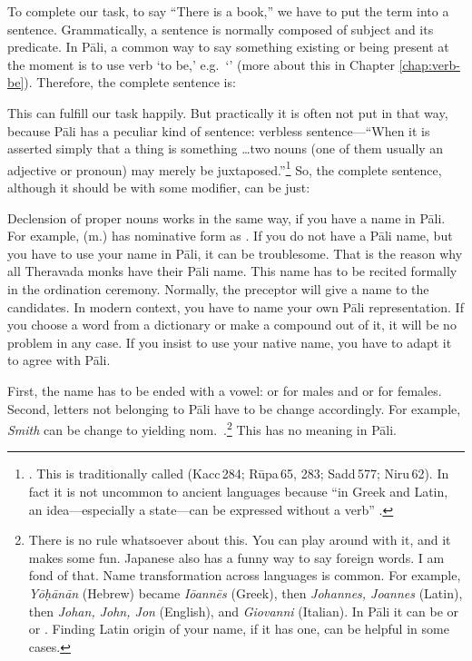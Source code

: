 To complete our task, to say ``There is a book,'' we have to put the term into a sentence. Grammatically, a sentence is normally composed of subject and its predicate. In P\=ali, a common way to say something existing or being present at the moment is to use verb `to be,' e.g.\ `' (more about this in Chapter \ref{chap:verb-be}). Therefore, the complete sentence is:


This can fulfill our task happily. But practically it is often not put in that way, because P\=ali has a peculiar kind of sentence: verbless sentence---``When it is asserted simply that a thing is something \ldots two nouns (one of them usually an adjective or pronoun) may merely be juxtaposed.''\footnote{\citealp[p.~9]{warder:intro}. This is traditionally called  (Kacc\,284; R\=upa\,65, 283; Sadd\,577; Niru\,62). In fact it is not uncommon to ancient languages because ``in Greek and Latin, an idea---especially a state---can be expressed without a verb'' \citep[p.~35]{fairbairn:understanding}.} So, the complete sentence, although it should be with some modifier, can be just:


Declension of proper nouns works in the same way, if you have a name in P\=ali. For example,  (m.) has nominative form as . If you do not have a P\=ali name, but you have to use your name in P\=ali, it can be troublesome. That is the reason why all Theravada monks have their P\=ali name. This name has to be recited formally in the ordination ceremony. Normally, the preceptor will give a name to the candidates. In modern context, you have to name your own P\=ali representation. If you choose a word from a dictionary or make a compound out of it, it will be no problem in any case. If you insist to use your native name, you have to adapt it to agree with P\=ali.

\label{par:foreignname}First, the name has to be ended with a vowel:  or  for males and  or  for females. Second, letters not belonging to P\=ali have to be change accordingly. For example, \emph{Smith} can be change to  yielding nom.\ .\footnote{There is no rule whatsoever about this. You can play around with it, and it makes some fun. Japanese also has a funny way to say foreign words. I am fond of that. Name transformation across languages is common. For example, \emph{Y\=o\d h\=an\=an} (Hebrew) became \emph{I\=oann\=es} (Greek), then \emph{Johannes, Joannes} (Latin), then \emph{Johan, John, Jon} (English), and \emph{Giovanni} (Italian). In P\=ali it can be  or  or . Finding Latin origin of your name, if it has one, can be helpful in some cases.} This has no meaning in P\=ali.

